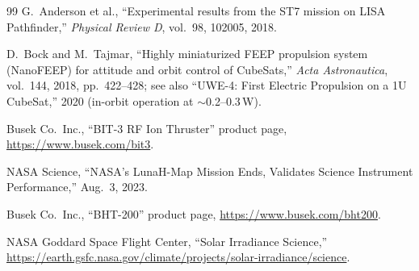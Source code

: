 \documentclass[11pt]{article}
\begin{document}
\begin{thebibliography}{99}
 G.~Anderson et al., ``Experimental results from the
  ST7 mission on LISA Pathfinder,'' \emph{Physical Review D}, vol.~98,
  102005, 2018.

 D.~Bock and M.~Tajmar, ``Highly miniaturized FEEP
  propulsion system (NanoFEEP) for attitude and orbit control of CubeSats,''
  \emph{Acta Astronautica}, vol.~144, 2018, pp.~422--428; see also
  ``UWE-4: First Electric Propulsion on a 1U CubeSat,'' 2020 (in-orbit
  operation at $\sim$0.2--0.3\,W).

 Busek Co.\ Inc., ``BIT-3 RF Ion Thruster'' product page,
  \url{https://www.busek.com/bit3}.

 NASA Science, ``NASA's LunaH-Map Mission Ends,
  Validates Science Instrument Performance,'' Aug.~3, 2023.

 Busek Co.\ Inc., ``BHT-200'' product page,
  \url{https://www.busek.com/bht200}.

 NASA Goddard Space Flight Center, ``Solar Irradiance
  Science,''
  \url{https://earth.gsfc.nasa.gov/climate/projects/solar-irradiance/science}.

\end{thebibliography}
\end{document}
